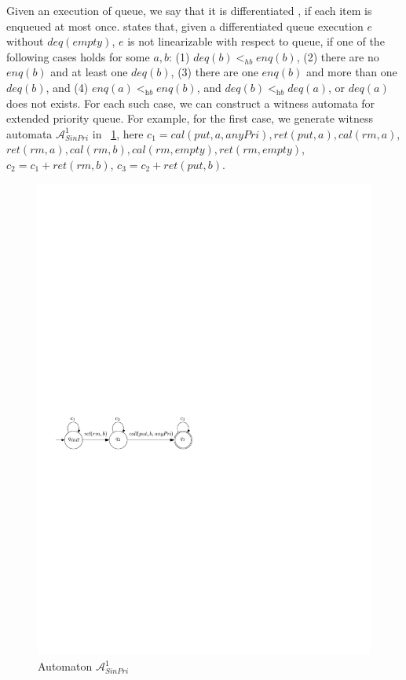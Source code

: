 Given an execution of queue, we say that it is differentiated \cite{Wolper:1986}, if each item is enqueued at most once. \cite{Bouajjani:2015} states that, given a differentiated queue execution $e$ without $\textit{deq}(\textit{empty})$, $e$ is not linearizable with respect to queue, if one of the following cases holds for some $a,b$: (1) $\textit{deq}(b) <_{hb} \textit{enq}(b)$, (2) there are no $\textit{enq}(b)$ and at least one $\textit{deq}(b)$, (3) there are one $\textit{enq}(b)$ and more than one $\textit{deq}(b)$, and (4) $\textit{enq}(a) <_{\textit{hb}} \textit{enq}(b)$, and $\textit{deq}(b) <_{\textit{hb}} \textit{deq}(a)$, or $\textit{deq}(a)$ does not exists. For each such case, we can construct a witness automata for extended priority queue. For example, for the first case, we generate witness automata $\mathcal{A}_{\textit{SinPri}}^1$ in \figurename~\ref{fig:automata for FIFO-1}, here $c_1 = \textit{cal}(\textit{put},a,\textit{anyPri}), \textit{ret}(\textit{put},a), \textit{cal}(\textit{rm},a)$, $\textit{ret}(\textit{rm},a),\textit{cal}(\textit{rm},b),\textit{cal}(\textit{rm},\textit{empty}),\textit{ret}(\textit{rm},\textit{empty})$, $c_2 = c_1 + \textit{ret}(\textit{rm},b)$, $c_3 = c_2 + \textit{ret}(\textit{put},b)$.


\begin{figure}[htbp]
  \centering
  \includegraphics[width=0.6 \textwidth]{figures/PIC_AUTO_FIFO_1.pdf}
  \caption{Automaton $\mathcal{A}_{\textit{SinPri}}^1$}
  \label{fig:automata for FIFO-1}
\end{figure}

